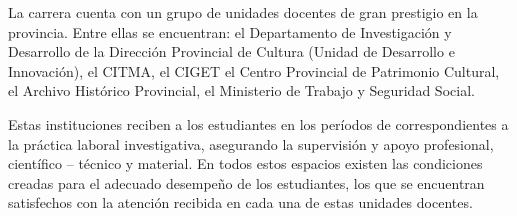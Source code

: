 La carrera cuenta con un grupo de unidades docentes de gran prestigio en la provincia. Entre ellas se encuentran: el Departamento de Investigación y Desarrollo de la Dirección Provincial de Cultura (Unidad de Desarrollo e Innovación), el CITMA, el CIGET el Centro Provincial de Patrimonio Cultural, el Archivo Histórico Provincial, el Ministerio de Trabajo y Seguridad Social.

Estas instituciones reciben a los estudiantes en los períodos de correspondientes a la práctica laboral investigativa, asegurando la supervisión y apoyo profesional, científico – técnico y material. En todos estos espacios existen las condiciones creadas para el adecuado desempeño de los estudiantes, los que se encuentran satisfechos con la atención recibida en cada una de estas unidades docentes.